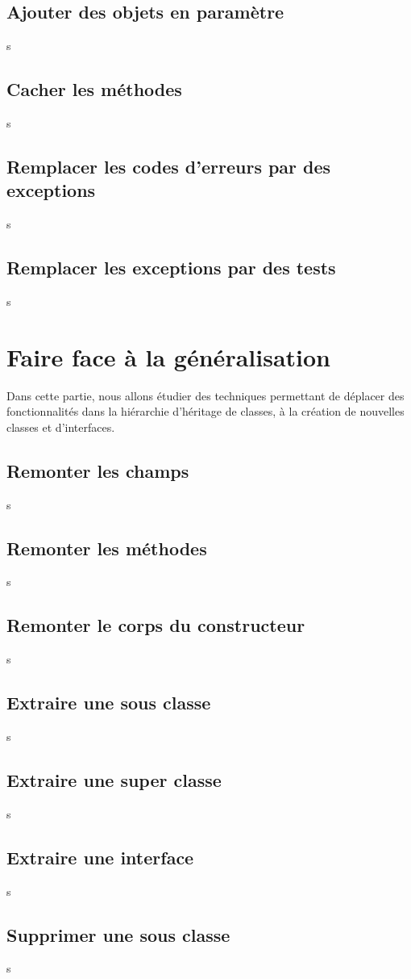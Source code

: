 \documentclass[a4paper,twoside,12pt,openright]{report}
\begin{document}
\subsection{Ajouter des objets en paramètre}
s
\subsection{Cacher les méthodes}
s
\subsection{Remplacer les codes d'erreurs par des exceptions}
s
\subsection{Remplacer les exceptions par des tests}
s


\newpage
\section{Faire face à la généralisation}
Dans cette partie, nous allons étudier des techniques permettant de déplacer des fonctionnalités dans la hiérarchie d'héritage de classes, à la création de nouvelles classes et d'interfaces.



\subsection{Remonter les champs}
s
\subsection{Remonter les méthodes}
s
\subsection{Remonter le corps du constructeur}
s
\subsection{Extraire une sous classe}
s
\subsection{Extraire une super classe}
s
\subsection{Extraire une interface}
s
\subsection{Supprimer une sous classe}
s
\end{document}
